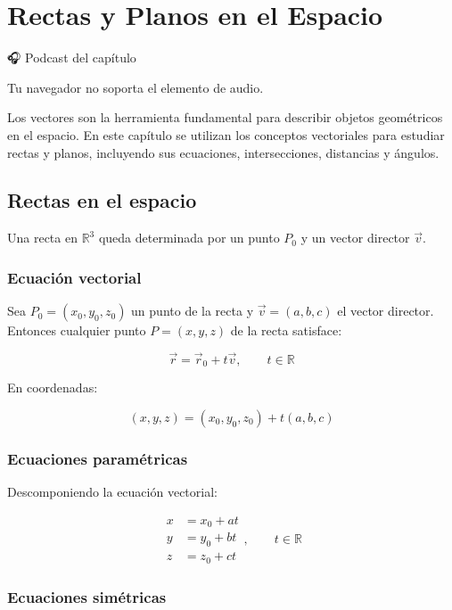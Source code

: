 \documentclass[
]{book}
\begin{document}
\chapter{Rectas y Planos en el Espacio}\label{rectas-planos}

🎧 Podcast del capítulo

Tu navegador no soporta el elemento de audio.

Los vectores son la herramienta fundamental para describir objetos geométricos en el espacio. En este capítulo se utilizan los conceptos vectoriales para estudiar rectas y planos, incluyendo sus ecuaciones, intersecciones, distancias y ángulos.

\section{Rectas en el espacio}\label{rectas-en-el-espacio}

Una recta en \(\mathbb{R}^3\) queda determinada por un punto \(P_0\) y un vector director \(\vec{v}\).

\subsection{Ecuación vectorial}\label{ecuaciuxf3n-vectorial}

Sea \(P_0 = (x_0, y_0, z_0)\) un punto de la recta y \(\vec{v} = (a, b, c)\) el vector director. Entonces cualquier punto \(P = (x, y, z)\) de la recta satisface:

\[
\vec{r} = \vec{r}_0 + t\vec{v}, \qquad t \in \mathbb{R}
\]

En coordenadas:

\[
(x, y, z) = (x_0, y_0, z_0) + t(a, b, c)
\]

\subsection{Ecuaciones paramétricas}\label{ecuaciones-paramuxe9tricas}

Descomponiendo la ecuación vectorial:

\[
\begin{aligned}
x &= x_0 + at \\
y &= y_0 + bt \\
z &= z_0 + ct
\end{aligned}, \qquad t \in \mathbb{R}
\]

\subsection{Ecuaciones simétricas}\label{ecuaciones-simuxe9tricas}
\end{document}
